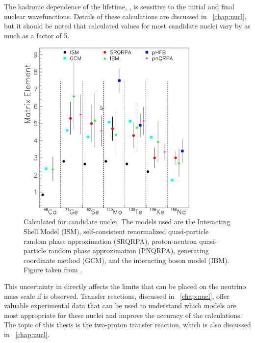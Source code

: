 The hadronic dependence of the lifetime, \NME, is sensitive to the initial and final nuclear wavefunctions.  Details of these calculations are discussed in {\chap}~\ref{chap:nucl}, but it should be noted that calculated \NME values for most candidate nuclei vary by as much as a factor of 5.
\begin{figure}[htp]
\centering
\includegraphics[width=0.8\textwidth]{figures/differentNME.eps}
\caption{Calculated \NME for candidate \zvbb nuclei.  The models used are the Interacting Shell Model (ISM), self-consistent renormalized quasi-particle random phase approximation (SRQRPA), proton-neutron quasi-particle random phase approximation (PNQRPA), generating coordinate method (GCM), and the interacting boson model (IBM).  Figure taken from \cite{zvbbReviewSchwingenheuer}.}
\label{fig:differentNME}
\end{figure}  
This uncertainty in \NME directly affects the limits that can be placed on the neutrino mass scale if \zvbb is observed.  Transfer reactions, discussed in {\chap}~\ref{chap:nucl}, offer valuable experimental data that can be used to understand which models are most appropriate for these nuclei and improve the accuracy of the calculations.  The topic of this thesis is the two-proton transfer reaction, which is also discussed in {\chap}~\ref{chap:nucl}.

